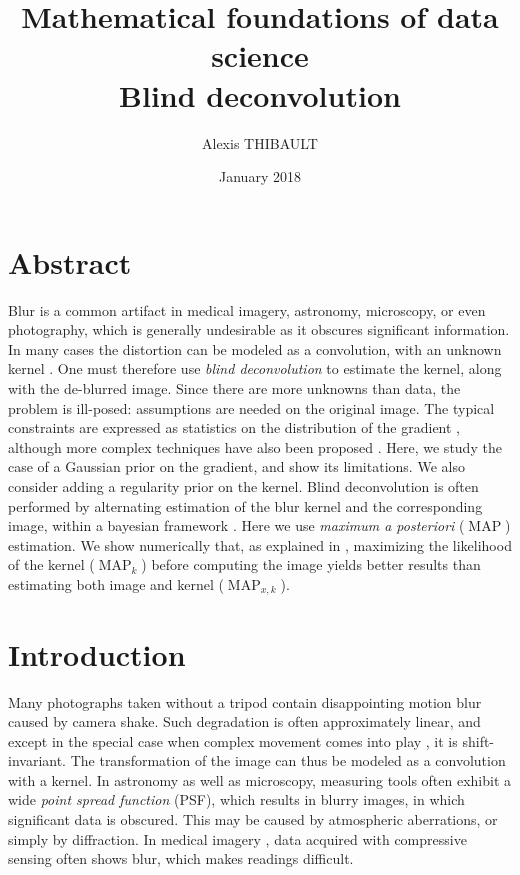 \documentclass[english,a4paper]{article}
\title{Mathematical foundations of data science\\
Blind deconvolution}
\date{January 2018}
\author{Alexis THIBAULT}
\theoremstyle{plain}
\theoremstyle{definition}
\theoremstyle{remark}
\DeclareMathOperator{\MAP}{MAP}
\begin{document}
\maketitle

\section{Abstract}
Blur is a common artifact in medical imagery, astronomy, microscopy, or even photography, which is generally undesirable as it obscures significant information.
In many cases the distortion can be modeled as a convolution, with an unknown kernel \cite{fergus2006removing,cho2009fast,cho2010motion,jia2007single,xu2010two}. One must therefore use \emph{blind deconvolution} to estimate the kernel, along with the de-blurred image.
Since there are more unknowns than data, the problem is ill-posed: assumptions are needed on the original image. The typical constraints are expressed as statistics on the distribution of the gradient \cite{joshi2008psf,krishnan2009fast,levi2009using,levin2007blind}, although more complex techniques have also been proposed \cite{miskin2000ensemble,jalobeanu2002satellite}. Here, we study the case of a Gaussian prior on the gradient, and show its limitations. We also consider adding a regularity prior on the kernel.
Blind deconvolution is often performed by alternating estimation of the blur kernel and the corresponding image, within a bayesian framework \cite{richardson1972bayesian,levin2007blind,levin2009understanding,levin2011efficient,krishnan2009fast,joshi2008psf,jia2007single,levi2009using}.
Here we use \emph{maximum a posteriori} ($\MAP$) estimation. We show numerically that, as explained in \cite{levin2011efficient}, maximizing the likelihood of the kernel ($\MAP_k$) before computing the image yields better results than estimating both image and kernel ($\MAP_{x,k}$).




\section{Introduction}
Many photographs taken without a tripod contain disappointing motion blur caused by camera shake. Such degradation is often approximately linear, and except in the special case when complex movement comes into play \cite{shan2007rotational,whyte2012non}, it is shift-invariant. The transformation of the image can thus be modeled as a convolution with a kernel.
In astronomy as well as microscopy, measuring tools often exhibit a wide \emph{point spread function} (PSF), which results in blurry images, in which significant data is obscured. This may be caused by atmospheric aberrations, or simply by diffraction.
In medical imagery \cite{chen2016compressive}, data acquired with compressive sensing often shows blur, which makes readings difficult.
\end{document}
